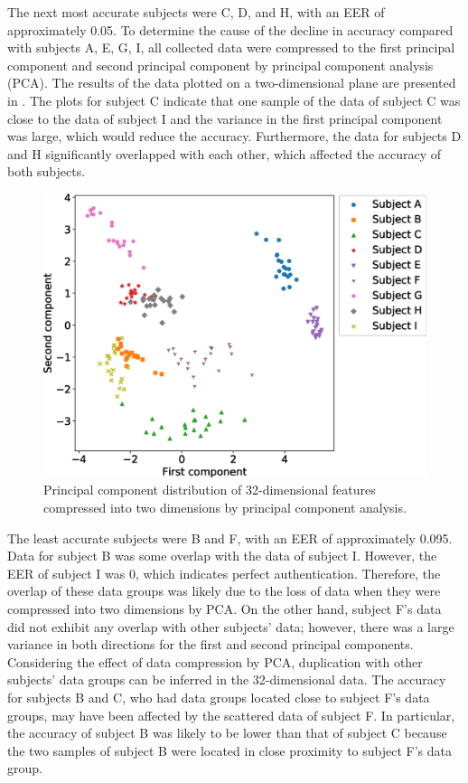 \documentclass[english,preprint,JIP]{ipsj}
\begin{document}
The next most accurate subjects were C, D, and H, with an EER of approximately 0.05. To determine the cause of the decline in accuracy compared with subjects A, E, G, I, all collected data were compressed to the first principal component and second principal component by principal component analysis (PCA). The results of the data plotted on a two-dimensional plane are presented in . The plots for subject C indicate that one sample of the data of subject C was close to the data of subject I and the variance in the first principal component was large, which would reduce the accuracy. Furthermore, the data for subjects D and H significantly overlapped with each other, which affected the accuracy of both subjects.\par

\begin{figure}[!t]
  \centering
    \includegraphics[width=1\linewidth]{figure/PCA.eps}
  \caption{Principal component distribution of 32-dimensional features compressed into two dimensions by principal component analysis.}
  \label{fig:PCA}
\end{figure}

The least accurate subjects were B and F, with an EER of approximately 0.095. Data for subject B was some overlap with the data of subject I. However, the EER of subject I was 0, which indicates perfect authentication. Therefore, the overlap of these data groups was likely due to the loss of data when they were compressed into two dimensions by PCA. On the other hand, subject F's data did not exhibit any overlap with other subjects' data; however, there was a large variance in both directions for the first and second principal components. Considering the effect of data compression by PCA, duplication with other subjects' data groups can be inferred in the 32-dimensional data. The accuracy for subjects B and C, who had data groups located close to subject F's data groups, may have been affected by the scattered data of subject F. In particular, the accuracy of subject B was likely to be lower than that of subject C because the two samples of subject B were located in close proximity to subject F's data group.\par
\end{document}
